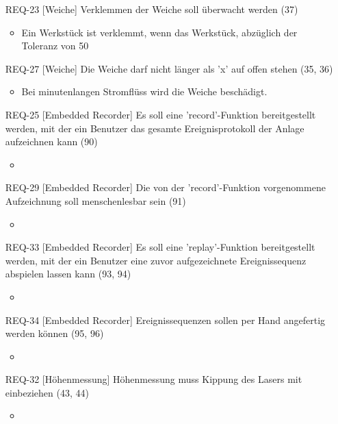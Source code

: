 \begin{itemize}
\begin{itemize}
    \end{itemize}
    \item[REQ-23][Weiche] Verklemmen der Weiche soll überwacht werden (37)
    \begin{itemize}
        \item Ein Werkstück ist verklemmt, wenn das Werkstück, abzüglich der Toleranz von 50%
    \end{itemize}
    \item[REQ-27][Weiche] Die Weiche darf nicht länger als 'x' auf offen stehen (35, 36)
    \begin{itemize}
        \item Bei minutenlangen Stromflüss wird die Weiche beschädigt.
    \end{itemize}
    \item[REQ-25][Embedded Recorder] Es soll eine 'record'-Funktion bereitgestellt werden, mit der ein Benutzer das gesamte Ereignisprotokoll der Anlage aufzeichnen kann (90)
    \begin{itemize}
        \item
    \end{itemize}
    \item[REQ-29][Embedded Recorder] Die von der 'record'-Funktion vorgenommene Aufzeichnung soll menschenlesbar sein (91)
    \begin{itemize}
        \item
    \end{itemize}
    \item[REQ-33][Embedded Recorder] Es soll eine 'replay'-Funktion bereitgestellt werden, mit der ein Benutzer eine zuvor aufgezeichnete Ereignissequenz abspielen lassen kann (93, 94)
    \begin{itemize}
        \item
    \end{itemize}
    \item[REQ-34][Embedded Recorder] Ereignissequenzen sollen per Hand angefertig werden können (95, 96)
    \begin{itemize}
        \item
    \end{itemize}
    \item[REQ-32][Höhenmessung] Höhenmessung muss Kippung des Lasers mit einbeziehen (43, 44)
    \begin{itemize}
        \item

\end{itemize}
\end{itemize}
